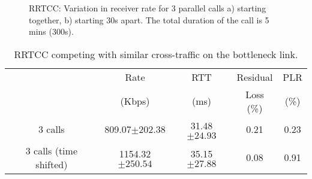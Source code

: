 \begin{figure}
\centerline{
  }
  \centerline{
  }
   \caption{RRTCC: Variation in receiver rate for 3 parallel calls a) starting
   together, b) starting 30s apart. The total duration of the call is 5 mins
   (300s).}
\label{fig:rrtcc-self-fair}
\end{figure}

\begin{table}
\begin{center}
\begin{tabular}{ccccc}
\hline
& Rate  & RTT & Residual & PLR\\
& (Kbps)& (ms) & Loss (\%) & (\%)\\ \hline
 3 calls &  809.07$\pm202.38$ &   31.48$\pm24.93$ & 0.21 & 0.23 \\  
 3 calls (time shifted) &  1154.32$\pm250.54$ &   35.15$\pm27.88$ & 0.08 & 0.91 \\ \hline
\end{tabular}
\end{center}
    \caption{RRTCC competing with similar cross-traffic on the bottleneck link.}
    \label{tab:self-fair}
\end{table}